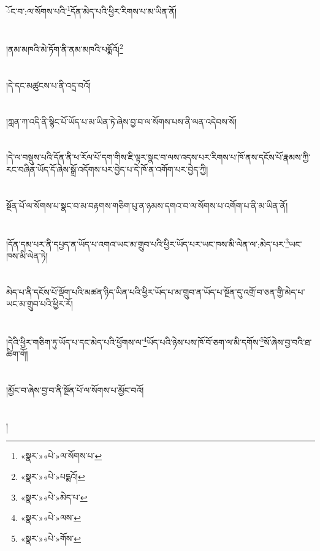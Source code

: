 ོང་བ་:ལ་སོགས་པའི་\footnote{«སྣར་»«པེ་»ལ་སོགས་པ་}དོན་མེད་པའི་ཕྱིར་རིགས་པ་མ་ཡིན་ནོ།\chapter{ }།ནམ་མཁའི་མེ་ཏོག་ནི་ནམ་མཁའི་པདྨོའོ།\footnote{«སྣར་»«པེ་»པདྨའོ།}\chapter{ }།དེ་དང་མཚུངས་པ་ནི་འདྲ་བའོ།\chapter{ }།ཀླན་ཀ་འདི་ནི་སྙིང་པོ་ཡོད་པ་མ་ཡིན་ཏེ་ཞེས་བྱ་བ་ལ་སོགས་པས་ནི་ལན་འདེབས་སོ།\chapter{ }།དེ་ལ་བསྡུས་པའི་དོན་ནི་ཕ་རོལ་པོ་དག་གིས་ཇི་ལྟར་སྣང་བ་ལས་འདས་པར་རིགས་པ་ཁོ་ནས་དངོས་པོ་རྣམས་ཀྱི་རང་བཞིན་ཡོད་དོ་ཞེས་སྒྲོ་འདོགས་པར་བྱེད་པ་དེ་ཁོ་ན་འགོག་པར་བྱེད་ཀྱི།\chapter{ }སྔོན་པོ་ལ་སོགས་པ་སྣང་བ་མ་བརྟགས་གཅིག་པུ་ན་ཉམས་དགའ་བ་ལ་སོགས་པ་འགོག་པ་ནི་མ་ཡིན་ནོ།\chapter{ }།དོན་དམ་པར་ནི་དཔྱད་ན་ཡོད་པ་འགའ་ཡང་མ་གྲུབ་པའི་ཕྱིར་ཡོད་པར་ཡང་ཁས་མི་ལེན་ལ་:མེད་པར་\footnote{«སྣར་»«པེ་»མེད་པ་}ཡང་ཁས་མི་ལེན་ཏེ།\chapter{ }མེད་པ་ནི་དངོས་པོ་ལྡོག་པའི་མཚན་ཉིད་ཡིན་པའི་ཕྱིར་ཡོད་པ་མ་གྲུབ་ན་ཡོད་པ་སྔོན་དུ་འགྲོ་བ་ཅན་གྱི་མེད་པ་ཡང་མ་གྲུབ་པའི་ཕྱིར་རོ།\chapter{ }།དེའི་ཕྱིར་གཅིག་ཏུ་ཡོད་པ་དང་མེད་པའི་ཕྱོགས་ལ་\footnote{«སྣར་»«པེ་»ལས་}ཡོད་པའི་ཉེས་པས་ཁོ་བོ་ཅག་ལ་མི་དགོས་\footnote{«སྣར་»«པེ་»གོས་}སོ་ཞེས་བྱ་བའི་ཐ་ཚིག་གོ།\chapter{ }།མྱོང་བ་ཞེས་བྱ་བ་ནི་སྔོན་པོ་ལ་སོགས་པ་མྱོང་བའོ།\chapter{ }།
